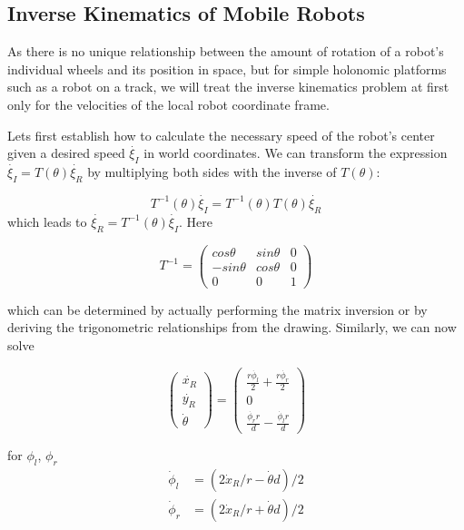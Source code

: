 \subsection{Inverse Kinematics of Mobile Robots}\label{sec:ivkmobile}
As there is no unique relationship between the amount of rotation of a robot's individual wheels and its position in space, but for simple holonomic platforms such as a robot on a track, we will treat the inverse kinematics problem at first only for the velocities of the local robot coordinate frame. 

Lets first establish how to calculate the necessary speed of the robot's center given a desired speed $ \dot{\xi_I}$ in world coordinates. We can transform the expression $ \dot{\xi_I}=T(\theta)\dot{\xi_R}$ by multiplying both sides with the inverse of $ T(\theta)$:

\begin{equation}\label{eq:mbik}
T^{-1}(\theta)\dot{\xi_I}=T^{-1}(\theta)T(\theta)\dot{\xi_R}
\end{equation}
which leads to $ \dot{\xi_R}=T^{-1}(\theta)\dot{\xi_I}$. Here

\begin{equation}
T^{-1}=\left(\begin{array}{ccc}cos \theta & sin \theta & 0 \\ -sin \theta & cos \theta & 0 \\ 0 & 0 & 1\end{array}\right)
\end{equation}

which can be determined by actually performing the matrix inversion or by deriving the trigonometric relationships from the drawing.  Similarly, we can now solve

\begin{equation}
\left(\begin{array}{c} \dot{x_R}\\\dot{y_R}\\\dot{\theta}\end{array}\right)=\left(\begin{array}{c}\frac{r\dot{\phi_l}}{2}+\frac{r\dot{\phi_r}}{2}\\0\\\frac{\dot{\phi_r} r}{d}-\frac{\dot{\phi_l} r}{d}\end{array}\right)
\end{equation}

for $ \phi_l$, $ \phi_r$
\begin{eqnarray}
\dot{\phi}_l &= (2\dot{x}_R/r - \dot{\theta}d)/2\\
\nonumber
\dot{\phi}_r &= (2\dot{x}_R/r + \dot{\theta}d)/2
\end{eqnarray}

